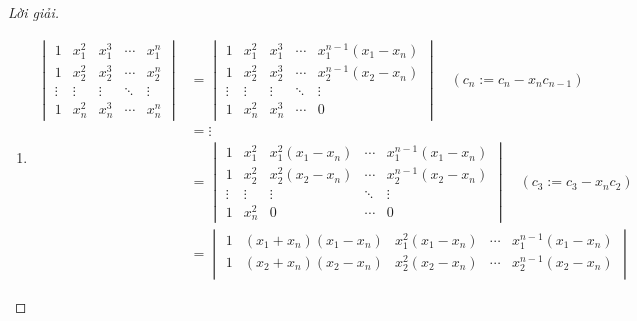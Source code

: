 \documentclass[class=linear-algebra,crop=false]{standalone}
\begin{document}
\begin{proof}[Lời giải]
	\begin{enumerate}[label = (\alph*)]
		\item
		      \begin{align*}
			      \begin{vmatrix}
				      1      & x_{1}^{2} & x_{1}^{3} & \cdots & x_{1}^{n} \\
				      1      & x_{2}^{2} & x_{2}^{3} & \cdots & x_{2}^{n} \\
				      \vdots & \vdots    & \vdots    & \ddots & \vdots    \\
				      1      & x_{n}^{2} & x_{n}^{3} & \cdots & x_{n}^{n}
			      \end{vmatrix}
			       & =
			      \begin{vmatrix}
				      1      & x_{1}^{2} & x_{1}^{3} & \cdots & x_{1}^{n-1}(x_{1} - x_{n}) \\
				      1      & x_{2}^{2} & x_{2}^{3} & \cdots & x_{2}^{n-1}(x_{2} - x_{n}) \\
				      \vdots & \vdots    & \vdots    & \ddots & \vdots                     \\
				      1      & x_{n}^{2} & x_{n}^{3} & \cdots & 0
			      \end{vmatrix}\quad(c_{n}:= c_{n} - x_{n}c_{n-1})                                     \\
			       & = \vdots                                                                                              \\
			       & =
			      \begin{vmatrix}
				      1      & x_{1}^{2} & x_{1}^{2}(x_{1} - x_{n}) & \cdots & x_{1}^{n-1}(x_{1} - x_{n}) \\
				      1      & x_{2}^{2} & x_{2}^{2}(x_{2} - x_{n}) & \cdots & x_{2}^{n-1}(x_{2} - x_{n}) \\
				      \vdots & \vdots    & \vdots                   & \ddots & \vdots                     \\
				      1      & x_{n}^{2} & 0                        & \cdots & 0
			      \end{vmatrix}\quad(c_{3}:=c_{3} - x_{n}c_{2})                      \\
			       & =
			      \begin{vmatrix}
				      1      & (x_{1} + x_{n})(x_{1} - x_{n}) & x_{1}^{2}(x_{1} - x_{n}) & \cdots & x_{1}^{n-1}(x_{1} - x_{n}) \\
				      1      & (x_{2} + x_{n})(x_{2} - x_{n}) & x_{2}^{2}(x_{2} - x_{n}) & \cdots & x_{2}^{n-1}(x_{2} - x_{n}) \\

\end{vmatrix}
\end{align*}
\end{enumerate}
\end{proof}
\end{document}
